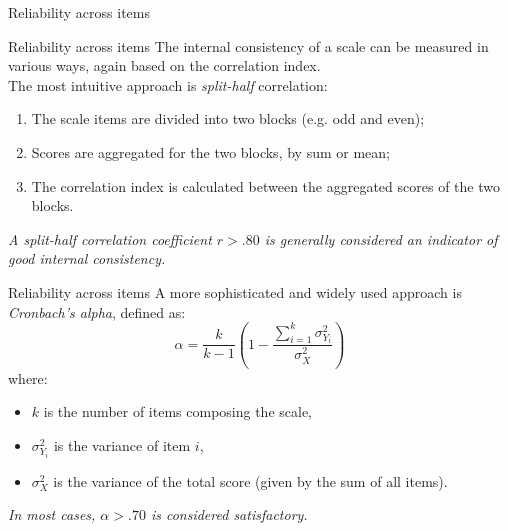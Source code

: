 \documentclass{beamer}
\begin{document}

\begin{frame}{Reliability across items}
    \centering
\end{frame}

\begin{frame}{Reliability across items}
    The internal consistency of a scale can be measured in various ways, again based on the correlation index. \\
    \vspace{1em}
    The most intuitive approach is \textit{split-half} correlation:
    \begin{enumerate}
        \item The scale items are divided into two blocks (e.g. odd and even);
        \item Scores are aggregated for the two blocks, by sum or mean;
        \item The correlation index is calculated between the aggregated scores of the two blocks.
    \end{enumerate}
    \centering
    \vspace{1em}
    \textit{A split-half correlation coefficient $r > .80$ is generally considered an indicator of good internal consistency.}
\end{frame}

\begin{frame}{Reliability across items}
A more sophisticated and widely used approach is \textit{Cronbach's alpha}, defined as:
\[
\alpha = \frac{k}{k - 1} \left(1 - \frac{\sum_{i=1}^{k} \sigma^2_{Y_i}}{\sigma^2_X}\right)
\]
where:
\begin{itemize}
    \item \(k\) is the number of items composing the scale,
    \item \(\sigma^2_{Y_i}\) is the variance of item \(i\),
    \item \(\sigma^2_X\) is the variance of the total score (given by the sum of all items).
\end{itemize}
\vspace{1em}
\centering
\textit{In most cases, \(\alpha > .70\) is considered satisfactory.}
\end{frame}
\end{document}
